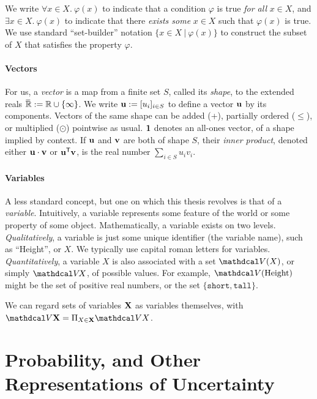 We write $\forall x \in X.~\varphi(x)$ to indicate that a condition $\varphi$ is true \emph{for all} $x \in X$, and $\exists x \in X.~ \varphi(x)$ to indicate that there \emph{exists some} $x \in X$ such that $\varphi(x)$ is true.
We use standard ``set-builder'' notation $\{ x \in X ~|~ \varphi(x) \}$ to construct the subset of $X$ that satisfies the property $\varphi$. 



\paragraph{Vectors}
For us, a \emph{vector} is a map from a finite set $S$, called its 
\emph{shape}, to the extended reals $\mskip1mu\overline{\mskip-1mu\mathbb R\!}\, := \mathbb R \cup \{\infty\}$.
We write $\mathbf u := [u_i]_{i \in S}$ to define a vector $\mathbf u$ by its components.
Vectors of the same shape
can be added (+), partially ordered ($\le$), or multiplied ($\odot$) pointwise as usual.
$\mathbf 1$ denotes an all-ones vector, of a shape implied by context.
If $\mathbf u$ and $\mathbf v$ are both of shape $S$, their \emph{inner product}, denoted either $\mathbf u \cdot \mathbf v$ or $\mathbf u ^{\sf T} \mathbf v$,
    is the real number $\sum_{i \in S} u_i v_i$. 

\paragraph{Variables}
A less standard concept, but one on which this thesis revolves is that of a \emph{variable}.
Intuitively, a variable represents some feature of the world or some property of some object. 
Mathematically, a variable exists on two levels.
\emph{Qualitatively}, a variable is just some unique identifier (the variable name), such as ``Height'', or $X$. 
We typically use capital roman letters for variables.
\emph{Quantitatively}, a variable $X$ is also associated with a set $\V(X)$, or simply $\V\!X$, of possible values. 
For example, $\V(\text{Height})$ might be the set of positive real numbers, 
    or the set $\{ \texttt{short}, \texttt{tall} \}$. 

We can regard sets of variables $\mathbf X$ as variables themselves, with
$\V \mat X = \Pi_{X \in \mat X} \V X$.


\section{Probability, and Other Representations of Uncertainty}

